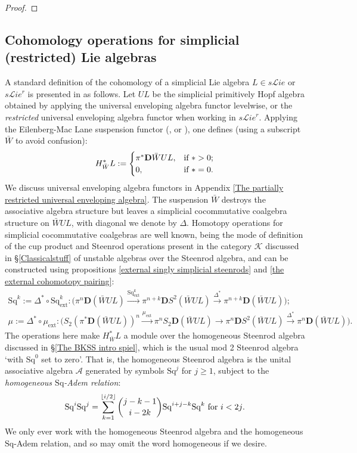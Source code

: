 \documentclass[11pt]{amsart} \renewcommand{\baselinestretch}{1.2}
\theoremstyle{plain}
\numberwithin{equation}{section} %
\theoremstyle{plain}
\numberwithin{equation}{chapter} %
\renewcommand{\to}{\longrightarrow}
\newcommand{\scrL}{\mathscr{L}}
\newcommand{\calA}{\mathcal{A}}
\newcommand{\calk}{\mathcal{K}}
\newcommand{\citeBOX}[2][]{\cite[\mbox{#1}]{#2}}
\newcommand{\ExtCohOp}{\mathrm{Sq}_\mathrm{ext}}
\newcommand{\ExtCohProd}{\mu_\mathrm{ext}}
\newcommand{\Sq}{\mathrm{Sq}}
\newcommand{\LieSteen}{\calA}
\newcommand{\liealgs}{{\scrL\!\textit{ie}}}
\newcommand{\restliealgs}{{\scrL\!\textit{ie}^\textit{r}}}
\newcommand{\dual}{\mathbf{D}}
\newcommand{\SubsectionOrSection}[1]{\subsection{#1}}
\begin{document}
\begin{Constructing cohomology operations}
\begin{proof}
\end{proof}
\SubsectionOrSection{Cohomology operations for simplicial (restricted) Lie algebras}
\label{section: Cohomology operations for simplicial (restricted) Lie algebras}
A standard definition of the cohomology of a simplicial Lie algebra $L\in s\liealgs$ or $s\restliealgs$ is presented in \cite{PriddySimplicialLie.pdf} as follows. Let $UL$ be the simplicial primitively Hopf algebra obtained by applying the universal enveloping algebra functor levelwise, or the \emph{restricted} universal enveloping algebra functor when working in $s\restliealgs$. %
Applying the Eilenberg-Mac Lane suspension functor (\citeBOX[\S2.3]{PriddySimplicialLie.pdf}, \citeBOX[\S5]{MillerSullivanConjecture.pdf} or \citeBOX[p.~87]{MaySimpObj.pdf}), one defines (using a subscript $\bar{W}$ to avoid confusion):
\[H_{\bar{W}}^*L:=\begin{cases}
\pi^*\dual\bar{W}UL,&\textup{if }*>0;\\
0,&\textup{if }*=0.
\end{cases}\]
We discuss universal enveloping algebra functors in Appendix \ref{The partially restricted universal enveloping algebra}.
The suspension $\bar{W}$ destroys the associative algebra structure but leaves a simplicial cocommutative coalgebra structure on $\bar{W}UL$, with diagonal we denote by $\Delta$. Homotopy operations for simplicial cocommutative coalgebras are well known, being the mode of definition of the cup product and Steenrod operations present in the category $\calk$ discussed in \S\ref{Classicalstuff} of unstable algebras over the Steenrod algebra, and can be constructed using  propositions \ref{external singly simplicial steenrods} and \ref{the external cohomotopy pairing}:
\begin{gather*}
\Sq^k:=\Delta^*\circ\ExtCohOp^k:\bigl(\pi^n\dual (\bar{W}UL)\overset{\ExtCohOp^k}{\to}\pi^{n+k}\dual S^2(\bar{W}UL)\overset{\Delta^*}{\to}\pi^{n+k}\dual (\bar{W}UL)\bigr);\\
\mu:=\Delta^*\circ\ExtCohProd:\bigl(S_2(\pi^*\dual(\bar{W}UL))^{n}\overset{\ExtCohProd}{\to} \pi^nS_2\dual(\bar{W}UL)\to \pi^n\dual S^2(\bar{W}UL)\overset{\Delta^*}{\to}\pi^n\dual (\bar{W}UL)\bigr).
\end{gather*}
The operations here make $H^*_{\bar{W}}L$ a module over the homogeneous Steenrod algebra discussed in \S\ref{The BKSS intro spiel}, which is the usual mod 2 Steenrod algebra `with $\Sq^0$ set to zero'. That is, the homogeneous Steenrod algebra is the unital associative algebra $\LieSteen$ generated by symbols $\Sq^j$ for $j\geq1$, subject to the \emph{homogeneous $\Sq$-Adem relation}:
\[\Sq^i\Sq^j=\sum_{k=1}^{\lfloor i/2\rfloor}\binom{j-k-1}{ i-2k}\Sq^{i+j-k}\Sq^k\textup{\ for $i<2j$.}\]
We only ever work with the homogeneous Steenrod algebra and the homogeneous $\Sq$-Adem relation, and so may omit the word homogeneous if we desire.


\end{Constructing cohomology operations}
\end{document}
